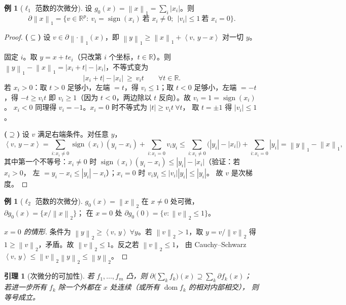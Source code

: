 \documentclass[11pt,a4paper,UTF8]{ctexart}
\theoremstyle{plain}
\newtheorem{lemma}[theorem]{引理}
\theoremstyle{definition}
\newtheorem{example}[theorem]{例}
\theoremstyle{remark}
\newcommand{\R}{\mathbb{R}}
\newcommand{\norm}[1]{\left\lVert #1 \right\rVert}
\newcommand{\abs}[1]{\left\lvert #1 \right\rvert}
\newcommand{\inner}[2]{\left\langle #1,\, #2 \right\rangle}
\newcommand{\dom}{\operatorname{dom}}
\DeclareMathOperator{\sign}{sign}
\begin{document}
\begin{example}[$\ell_1$ 范数的次微分]\label{ex:l1sub}
设 $g_0(x)=\norm{x}_1=\sum_i\abs{x_i}$。则
\[
\partial\norm{x}_1=\{v\in\R^p:\ v_i=\sign(x_i)\ \text{若 }x_i\neq0;\ \ \abs{v_i}\le1\ \text{若 }x_i=0\}.
\]
\end{example}

\begin{proof}
\textbf{($\subseteq$)} 设 $v\in\partial\norm{\cdot}_1(x)$，即 $\norm{y}_1\ge\norm{x}_1+\inner{v}{y-x}$ 对一切 $y$。

固定 $i$。取 $y=x+t e_i$（只改第 $i$ 个坐标，$t\in\R$）。则
$\norm{y}_1-\norm{x}_1=\abs{x_i+t}-\abs{x_i}$，不等式变为
\[
\abs{x_i+t}-\abs{x_i}\ \ge\ v_it\qquad\forall t\in\R .
\]
若 $x_i>0$：取 $t>0$ 足够小，左端 $=t$，得 $v_i\le1$；取 $t<0$ 足够小，左端 $=-t$，得 $-t\ge v_it$
即 $v_i\ge1$（因为 $t<0$，两边除以 $t$ 反向）。故 $v_i=1=\sign(x_i)$。
$x_i<0$ 同理得 $v_i=-1$。$x_i=0$ 时不等式为 $\abs{t}\ge v_it\ \forall t$，
取 $t=\pm1$ 得 $\abs{v_i}\le1$。

\textbf{($\supseteq$)} 设 $v$ 满足右端条件。对任意 $y$，
\[
\inner{v}{y-x}=\sum_{i:x_i\neq0}\sign(x_i)(y_i-x_i)+\sum_{i:x_i=0}v_iy_i
\le\sum_{i:x_i\neq0}\bigl(\abs{y_i}-\abs{x_i}\bigr)+\sum_{i:x_i=0}\abs{y_i}
=\norm{y}_1-\norm{x}_1,
\]
其中第一个不等号：$x_i\neq0$ 时 $\sign(x_i)(y_i-x_i)\le\abs{y_i}-\abs{x_i}$（验证：若 $x_i>0$，
左 $=y_i-x_i\le\abs{y_i}-x_i$）；$x_i=0$ 时 $v_iy_i\le\abs{v_i}\abs{y_i}\le\abs{y_i}$。
故 $v$ 是次梯度。
\end{proof}

\begin{example}[$\ell_2$ 范数的次微分]
$g_0(x)=\norm{x}_2$ 在 $x\neq0$ 处可微，$\partial g_0(x)=\{x/\norm{x}_2\}$；
在 $x=0$ 处 $\partial g_0(0)=\{v:\norm{v}_2\le1\}$。
\end{example}

\begin{proof}[$x=0$ 的情形]
条件为 $\norm{y}_2\ge\inner{v}{y}\ \forall y$。若 $\norm{v}_2>1$，取 $y=v/\norm{v}_2$ 得
$1\ge\norm{v}_2$，矛盾。故 $\norm{v}_2\le1$。反之若 $\norm{v}_2\le1$，
由 Cauchy--Schwarz $\inner{v}{y}\le\norm{v}_2\norm{y}_2\le\norm{y}_2$。
\end{proof}

\begin{lemma}[次微分的可加性]\label{lem:sumsub}
若 $f_1,\dots,f_m$ 凸，则 $\partial\bigl(\sum_k f_k\bigr)(x)\supseteq\sum_k\partial f_k(x)$；
若进一步所有 $f_k$ 除一个外都在 $x$ 处连续（或所有 $\dom f_k$ 的相对内部相交），
则等号成立。
\end{lemma}
\end{document}

